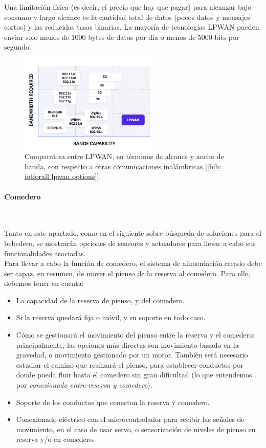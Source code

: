 \documentclass[12pt]{article}
\newcommand{\subsubsubsection}[1]{\paragraph{#1}\mbox{}\\}
\begin{document}
	\noindent Una limitación física (es decir, el precio que hay que pagar) para alcanzar bajo consumo y largo alcance es la cantidad total de datos (pocos datos y mensajes cortos) y las reducidas tasas binarias. La mayoría de tecnologías LPWAN pueden enviar solo menos de 1000 bytes de datos por día o menos de 5000 bits por segundo. \\
	
	\begin{figure}[h]
		\begin{center}
			\includegraphics[width=0.6\textwidth]{img/LPWAN_comp.png}
			\caption{Comparativa entre LPWAN, en términos de alcance y ancho de banda, con respecto a otras comunicaciones inalámbricas [\ref{bib: iotforall lpwan options}].}
			\label{LPWANs vs otros}
		\end{center}
	\end{figure}

	\pagebreak
	
	\subsubsubsection{Comedero}
	\label{subsubsubsection: comedero busqueda}
	
	\noindent Tanto en este apartado, como en el siguiente sobre búsqueda de soluciones para el bebedero, se mostrarán opciones de sensores y actuadores para llevar a cabo sus funcionalidades asociadas.\\
	
	\noindent Para llevar a cabo la función de comedero, el sistema de alimentación creado debe ser capaz, en resumen, de mover el pienso de la reserva al comedero. Para ello, debemos tener en cuenta: 
	
	\begin{itemize}
		\item La capacidad de la reserva de pienso, y del comedero.
		\item Si la reserva quedará fija o móvil, y su soporte en todo caso.
		\item Cómo se gestionará el movimiento del pienso entre la reserva y el comedero; principalmente, las opciones más directas son movimiento basado en la gravedad, o movimiento gestionado por un motor. También será necesario estudiar el camino que realizará el pienso, para establecer conductos por donde pueda fluir hasta el comedero sin gran dificultad (lo que entendemos por \textit{conexionado entre reserva y comedero}).
		\item Soporte de los conductos que conectan la reserva y comedero.
		\item Conexionado eléctrico con el microcontrolador para recibir las señales de movimiento, en el caso de usar servo, o sensorización de niveles de pienso en reserva y/o en comedero.
	\end{itemize}
	
\end{document}
